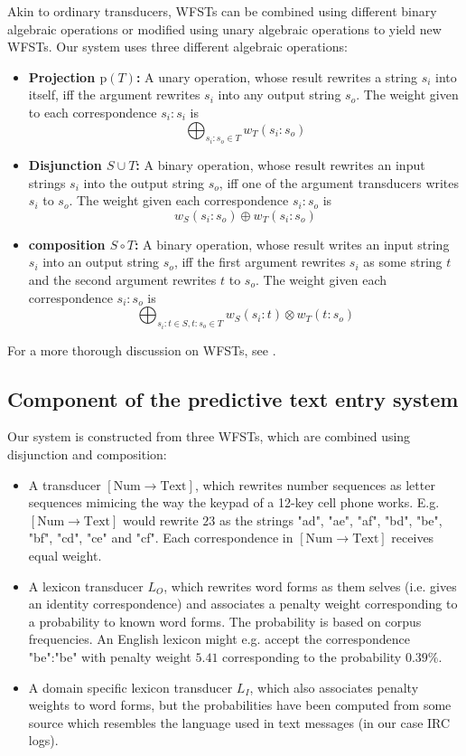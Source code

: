 \documentclass[a4paper,conference]{IEEEtran}
\begin{document}
Akin to ordinary transducers, WFSTs can be combined using
different binary algebraic operations or modified using unary
algebraic operations to yield new WFSTs. Our system uses three
different algebraic operations:
\begin{itemize}
\item {\bf Projection $\mathrm{p}(T)$:} A unary operation, whose result
  rewrites a string $s_i$ into itself, iff the argument rewrites $s_i$
  into any output string $s_o$. The weight given to each correspondence
  $s_i:s_i$ is
  $$\bigoplus_{s_i\mathrm{:}s_o \in T} w_T(s_i\mathrm{:}s_o)$$
\item {\bf Disjunction $S \cup T$:} A binary operation, whose result
  rewrites an input strings $s_i$ into the output string $s_o$, iff
  one of the argument transducers writes $s_i$ to $s_o$. The weight
  given each correspondence $s_i\mathrm{:}s_o$ is
  $$w_S(s_i\mathrm{:}s_o) \oplus w_T(s_i\mathrm{:}s_o)$$
\item {\bf composition $S \circ T$:} A binary operation, whose result
  writes an input string $s_i$ into an output string $s_o$, iff the
  first argument rewrites $s_i$ as some string $t$ and the second
  argument rewrites $t$ to $s_o$. The weight given each correspondence
  $s_i\mathrm{:}s_o$ is
  $$\bigoplus_{s_i\mathrm{:}t \in S, t\mathrm{:}s_o \in T} w_S(s_i\mathrm{:}t) \otimes w_T(t\mathrm{:}s_o)$$
\end{itemize}
For a more thorough discussion on WFSTs, see \cite{openfst/2007}.

\subsection{Component of the predictive text entry system}
Our system is constructed from three WFSTs, which are combined using disjunction and composition:
\begin{itemize}
\item A transducer $[\mathrm{Num}\rightarrow\mathrm{Text}]$, which
  rewrites number sequences as letter sequences mimicing the way the
  keypad of a 12-key cell phone
  works. E.g. $[\mathrm{Num}\rightarrow\mathrm{Text}]$ would rewrite
  $23$ as the strings "ad", "ae", "af", "bd", "be", "bf", "cd", "ce"
  and "cf". Each correspondence in $[\mathrm{Num}\rightarrow\mathrm{Text}]$
  receives equal weight.
\item A lexicon transducer $L_O$, which rewrites word forms as them
  selves (i.e. gives an identity correspondence) and associates a
  penalty weight corresponding to a probability to known word
  forms. The probability is based on corpus frequencies. An English
  lexicon might e.g. accept the correspondence "be":"be" with penalty
  weight $5.41$ corresponding to the probability $0.39\%$.
\item A domain specific lexicon transducer $L_I$, which also
  associates penalty weights to word forms, but the probabilities have
  been computed from some source which resembles the language used in
  text messages (in our case IRC logs).
\end{itemize}
\end{document}
